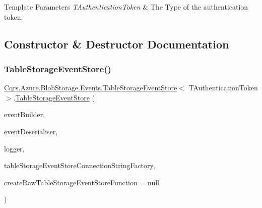 \begin{DoxyTemplParams}{Template Parameters}
{\em T\+Authentication\+Token} & The Type of the authentication token.\\
\hline
\end{DoxyTemplParams}


\subsection{Constructor \& Destructor Documentation}
\mbox{\label{classCqrs_1_1Azure_1_1BlobStorage_1_1Events_1_1TableStorageEventStore_a25a65bc4a027b2a16ebf02e763ac3b95_a25a65bc4a027b2a16ebf02e763ac3b95}} 
\subsubsection{\texorpdfstring{Table\+Storage\+Event\+Store()}{TableStorageEventStore()}}
{\footnotesize\ttfamily \hyperlink{classCqrs_1_1Azure_1_1BlobStorage_1_1Events_1_1TableStorageEventStore}{Cqrs.\+Azure.\+Blob\+Storage.\+Events.\+Table\+Storage\+Event\+Store}$<$ T\+Authentication\+Token $>$.\hyperlink{classCqrs_1_1Azure_1_1BlobStorage_1_1Events_1_1TableStorageEventStore}{Table\+Storage\+Event\+Store} (\begin{DoxyParamCaption}\item[{\hyperlink{interfaceCqrs_1_1Events_1_1IEventBuilder}{I\+Event\+Builder}$<$ T\+Authentication\+Token $>$}]{event\+Builder,  }\item[{\hyperlink{interfaceCqrs_1_1Events_1_1IEventDeserialiser}{I\+Event\+Deserialiser}$<$ T\+Authentication\+Token $>$}]{event\+Deserialiser,  }\item[{I\+Logger}]{logger,  }\item[{\hyperlink{interfaceCqrs_1_1Azure_1_1BlobStorage_1_1ITableStorageStoreConnectionStringFactory}{I\+Table\+Storage\+Store\+Connection\+String\+Factory}}]{table\+Storage\+Event\+Store\+Connection\+String\+Factory,  }\item[{Func$<$ I\+Logger, \hyperlink{interfaceCqrs_1_1Azure_1_1BlobStorage_1_1ITableStorageStoreConnectionStringFactory}{I\+Table\+Storage\+Store\+Connection\+String\+Factory}, bool, \hyperlink{classCqrs_1_1Azure_1_1BlobStorage_1_1Events_1_1TableStorageEventStore_1_1RawTableStorageEventStore}{Raw\+Table\+Storage\+Event\+Store}$<$ T\+Authentication\+Token $>$ $>$}]{create\+Raw\+Table\+Storage\+Event\+Store\+Function = {\ttfamily null} }\end{DoxyParamCaption})}



